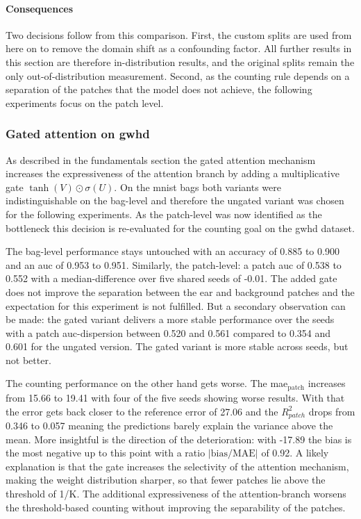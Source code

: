 \documentclass[12pt,parskip = half, DIV=classic,listof=totoc]{scrartcl}
\begin{document}
				\paragraph{Consequences}
				Two decisions follow from this comparison. First, the custom splits are used from
				here on to remove the domain shift as a confounding factor. All further results in
				this section are therefore in-distribution results, and the original splits remain
				the only out-of-distribution measurement. Second, as the counting rule depends on
				a separation of the patches that the model does not achieve, the following
				experiments focus on the patch level.

			\subsubsection{Gated attention on \acs*{gwhd}}\label{sec:gwhd_gated}
			As described in the fundamentals section the gated attention mechanism increases the expressiveness of the attention branch by 
			adding a multiplicative gate $\tanh(V) \odot \sigma(U)$. On the \ac{mnist} bags both variants were indistinguishable on the bag-level and
			therefore the ungated variant was chosen for the following experiments. As the patch-level was now identified as the bottleneck this
			decision is re-evaluated for the counting goal on the \ac{gwhd} dataset.
			
			The bag-level performance stays untouched with an accuracy of 0.885 to 0.900 and an \ac{auc} of 0.953 to 0.951. Similarly, the patch-level:
			a patch \ac{auc} of 0.538 to 0.552 with a median-difference over five shared seeds of -0.01. The added gate does not improve the separation between
			the ear and background patches and the expectation for this experiment is not fulfilled. But a secondary observation can be made:
			the gated variant delivers a more stable performance over the seeds with a patch \acs*{auc}-dispersion between 0.520 and 0.561 compared to 0.354 and 0.601 
			for the ungated version. The gated variant is more stable across seeds, but not better.

			The counting performance on the other hand gets worse. The \acs*{mae}$_\text{patch}$ increases from 15.66 to 19.41 with four of the five seeds
			showing worse results. With that the error gets back closer to the reference error of 27.06 and the  $R^2_{patch}$ drops from 0.346 to 0.057 meaning the 
			predictions barely explain the variance above the mean. More insightful is the direction of the deterioration: with -17.89 the bias
			is the most negative up to this point with a ratio $|\text{bias}/\text{MAE}|$ of 0.92. A likely explanation is
			that the gate increases the selectivity of the attention mechanism, making the weight distribution sharper, so that fewer patches lie above the threshold of 
			1/K. The additional expressiveness of the attention-branch worsens the threshold-based counting without improving the separability of the patches.
			
\end{document}
